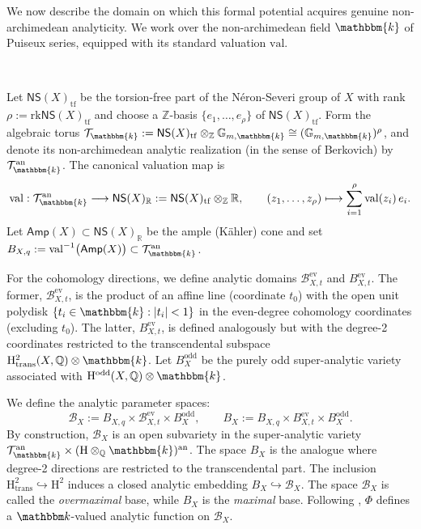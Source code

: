 \documentclass[12pt,a4paper]{amsart}
\theoremstyle{definition}
\theoremstyle{remark}
\newcommand{\Q}{\mathbb{Q}}
\newcommand{\R}{\mathbb{R}}
\newcommand{\Z}{\mathbb{Z}}
\newcommand{\rank}{\mathrm{rk}}
\begin{document}
We now describe the domain on which this formal potential acquires genuine non-archimedean analyticity. We work over the non-archimedean field $\mathbbm{k}$ of Puiseux series, equipped with its standard valuation $\mathrm{val}.$ 

\ 

Let $\mathsf{NS}(X)_{\mathrm{tf}}$ be the torsion-free part of the N\'eron-Severi group of $X$ with rank $\rho:=\rank\mathsf{NS}(X)_{\mathrm{tf}}$ and choose a $\Z$-basis $\{e_1,\dots,e_\rho\}$ of $\mathsf{NS}(X)_{\mathrm{tf}}$. Form the algebraic torus $\mathcal{T}_{\mathbbm{k}}:=\mathsf{NS}(X)_{\mathrm{tf}}\otimes_{\Z}\mathbb{G}_{m,\mathbbm{k}} \cong (\mathbb{G}_{m,\mathbbm{k}})^\rho$, and denote its non-archimedean analytic realization (in the sense of Berkovich) by $\mathcal{T}_{\mathbbm{k}}^{\mathrm{an}}$. The canonical valuation map is
\[
\operatorname{val}:\mathcal{T}_{\mathbbm{k}}^{\mathrm{an}}\longrightarrow \mathsf{NS}(X)_{\R}
:=\mathsf{NS}(X)_{\mathrm{tf}}\otimes_{\Z}\R,
\qquad
(z_1,\dots,z_\rho)\longmapsto \sum_{i=1}^\rho \operatorname{val}(z_i)\, e_i.
\]
Let $\mathsf{Amp}(X)\subset\mathsf{NS}(X)_{\R}$ be the ample (K\"ahler) cone and set $B_{X,q}:=\mathrm{val}^{-1}\big(\mathsf{Amp}(X)\big)\subset\mathcal{T}_{\mathbbm{k}}^{\mathrm{an}}$. 

For the cohomology directions, we define analytic domains $\mathcal B^{\mathrm{ev}}_{X,t}$ and $B^{\mathrm{ev}}_{X,t}$. The former, $\mathcal B^{\mathrm{ev}}_{X,t}$, is the product of an affine line (coordinate $t_0$) with the open unit polydisk $\{ t_i \in \mathbbm{k}: |t_i| < 1 \}$ in the even-degree cohomology coordinates (excluding $t_0$). The latter, $B^{\mathrm{ev}}_{X,t}$, is defined analogously but with the degree-2 coordinates restricted to the transcendental subspace $\mathrm{H}^2_{\mathrm{trans}}(X,\Q)\otimes\mathbbm{k}$. Let $B_X^{\mathrm{odd}}$ be the purely odd super-analytic variety associated with $\mathrm{H}^{\mathrm{odd}}(X,\Q)\otimes\mathbbm{k}$.

We define the analytic parameter spaces:
\[
\mathcal B_X:= B_{X,q}\times\mathcal B^{\mathrm{ev}}_{X,t}\times B_X^{\mathrm{odd}},
\qquad
B_X:= B_{X,q}\times B^{\mathrm{ev}}_{X,t}\times B_X^{\mathrm{odd}}.
\]
By construction, $\mathcal B_X$ is an open subvariety in the super-analytic variety $\mathcal{T}_{\mathbbm{k}}^{\mathrm{an}}\times (\mathrm{H}\otimes_{\Q}\mathbbm{k})^{\mathrm{an}}$. The space $B_X$ is the analogue where degree-2 directions are restricted to the transcendental part. The inclusion $\mathrm{H}^2_{\mathrm{trans}}\hookrightarrow \mathrm{H}^2$ induces a closed analytic embedding $B_X\hookrightarrow\mathcal B_X$. The space $\mathcal B_X$ is called the \emph{overmaximal} base, while $B_X$ is the \emph{maximal} base. Following \cite[Lemma 3.29]{katzarkovpantevyu}, $\Phi$ defines a $\mathbbm k$-valued analytic function on $\mathcal B_X$.
\end{document}
